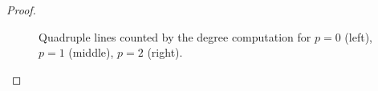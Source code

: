 \documentclass[12pt]{article}
\theoremstyle{plain}
\theoremstyle{definition}
\begin{document}
\begin{proof}
\begin{figure}
\begin{center}
\end{center}
\caption{Quadruple lines counted by the degree computation
for $p=0$ (left), $p=1$ (middle), $p=2$ (right).}
\label{4lines}
\end{figure}


\end{proof}
\end{document}
